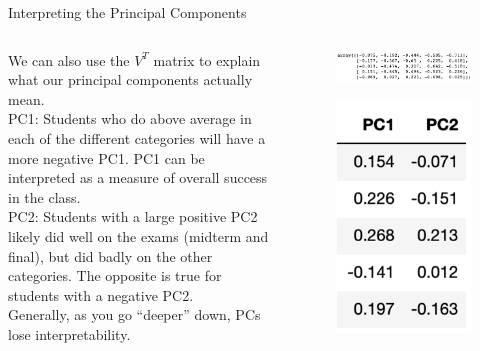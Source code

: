 \documentclass[aspectratio=169]{../latex_main/tntbeamer}  %
\begin{document}
	
	\begin{frame}{Interpreting the Principal Components}
	    \begin{columns}
	        \begin{column}{.5\textwidth}
	                We can also use the $V^T$ matrix to explain what our principal components actually mean.\\
	                PC1: Students who do above average in each of the different categories will have a more negative PC1. PC1 can be interpreted as a measure of overall success in the class.\\
	                \bigskip
	                PC2: Students with a large positive PC2 likely did well on the exams (midterm and final), but did badly on the other categories. The opposite is true for students with a negative PC2.\\
                    Generally, as you go “deeper” down, PCs lose interpretability.
	        \end{column}
	        
	        
	        \begin{column}{.5\textwidth}
	                \begin{figure}
	                    \centering
	                    \includegraphics[scale=.4]{Bild16}
	                \end{figure}
	                
	                 \begin{figure}
	                    \centering
	                    \includegraphics[scale=.5]{Bild17}
	                \end{figure}
	        \end{column}
	    \end{columns}
	    
	\end{frame}
\end{document}
